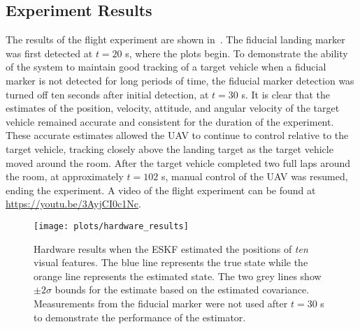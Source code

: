 
\subsection{Experiment Results}

The results of the flight experiment are shown in~.
The fiducial landing marker was first detected at $t = 20$ s, where the plots
begin.
To demonstrate the ability of the
system to maintain good tracking of a target vehicle when a fiducial
marker is not detected for long periods of time, the fiducial marker detection
was turned off ten seconds after initial detection, at $t = 30$ s.
It is clear that the estimates of the position, velocity, attitude, and angular
velocity of the target vehicle remained accurate and consistent for the duration
of the experiment.
These accurate estimates allowed
the UAV to continue to control relative to the target vehicle, tracking closely
above the landing target as the target vehicle moved around the room. After the
target vehicle completed two full laps around the room,
at approximately $t=102$ s, manual control of the UAV was resumed, ending the experiment.
A video of the flight experiment can be found at
\url{https://youtu.be/3AyjCI0c1Nc}.

\begin{figure}
  \centering
  \texttt{[image: plots/hardware\_results]}
  \caption[ESKF Hardware Results Using Ten Visual Features]{Hardware results when
    the ESKF estimated the positions of \emph{ten} visual
  features. The blue line represents the true state while the orange line
  represents the estimated state. The two grey lines show $\pm 2 \sigma$ bounds for
  the estimate based on the estimated covariance. Measurements from the fiducial
  marker were not used after $t = 30$ s to demonstrate the performance of the estimator.}
  \label{fig:est_hardware}
\end{figure}
